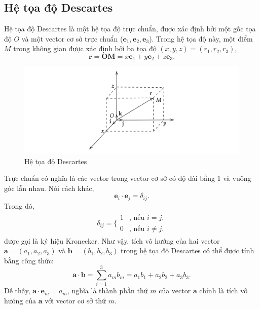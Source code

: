 \subsection{Hệ tọa độ Descartes}
\begin{definition}
    Hệ tọa độ Descartes là một hệ tọa độ trực chuẩn, được xác định bởi một gốc tọa độ \(O\) và một vector cơ sở trực chuẩn (\(\mathbf{e}_1, \mathbf{e}_2, \mathbf{e}_3\)). Trong hệ tọa độ này, một điểm \(M\) trong không gian được xác định bởi ba tọa độ \((x, y, z)=(r_1, r_2, r_3)\),
    \begin{equation}
        \mathbf{r}=\mathbf{OM} = x\mathbf{e}_1 + y\mathbf{e}_2 + z\mathbf{e}_3.
    \end{equation}
\end{definition}
\begin{figure}[H]
    \centering
    \includegraphics[width=1\textwidth]{Tuan2/Figures/toadodescartes.png}
    \caption{Hệ tọa độ Descartes}
\end{figure}
Trực chuẩn có nghĩa là các vector trong vector cơ sở có độ dài bằng 1 và vuông góc lẫn nhau. Nói cách khác, 
\begin{equation}
    \mathbf{e}_i \cdot \mathbf{e}_j =\delta_{ij}.
\end{equation}
Trong đó, \begin{equation*}
\begin{array}{l}
     \delta_{ij}=\Bigg\{
    \begin{array}{ll}
      1  & \text{, nếu } i=j. \\
      0  & \text{, nếu } i\neq j.
    \end{array}
\end{array}
\end{equation*} được gọi là ký hiệu Kronecker. Như vậy, tích vô hướng của hai vector \(\mathbf{a}=(a_1, a_2, a_3)\) và \(\mathbf{b}=(b_1,b_2,b_3)\) trong hệ tọa độ Descartes có thể được tính bằng công thức:
\begin{equation}
    \mathbf{a}\cdot\mathbf{b}=\sum_{i=1}^{3} a_m b_m = a_1 b_1 + a_2 b_2 + a_3 b_3.
\end{equation} Dễ thấy, \(\mathbf{a} \cdot \mathbf{e}_m =a_m\), nghĩa là thành phần thứ \(m\) của vector \(\mathbf{a}\) chính là tích vô hướng của \(\mathbf{a}\) với vector cơ sở thứ \(m\).
